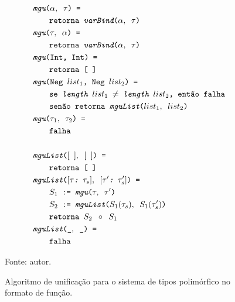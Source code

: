 \begin{figure}[ht!]
  \centering
  \begin{align*}
    & \texttt{\Mgu($\alpha,\Whitespace\tau$) = } \\
    & \qquad{} \texttt{\Return\Whitespace\UnifyVar($\alpha,\Whitespace\tau$)} \\
    & \texttt{\Mgu($\tau,\Whitespace\alpha$) = } \\
    & \qquad{} \texttt{\Return\Whitespace\UnifyVar($\alpha,\Whitespace\tau$)} \\
    & \texttt{\Mgu(\texttt{Int},\Whitespace\texttt{Int}) = } \\
    & \qquad{} \texttt{\Return\Whitespace[$\Whitespace$]} \\
    & \texttt{\Mgu(\texttt{Neg}\Whitespace ${list}_{1}$,\Whitespace\texttt{Neg} ${list}_{2}$) = } \\
    & \qquad{} \texttt{\If \Whitespace \Length\Whitespace${list}_{1}$ $\neq$ \Length\Whitespace${list}_{2}$, \Then \Whitespace \Fail} \\
    & \qquad{} \texttt{\Else\Whitespace\Return\Whitespace\MguList(${list}_{1},\Whitespace{list}_{2}$)} \\
    & \texttt{\Mgu($\tau_1,\Whitespace\tau_2$) = } \\
    & \qquad{} \texttt{\Fail} \\
    \\
    & \texttt{\MguList($[\Whitespace],\Whitespace[\Whitespace]$) = } \\
    & \qquad{} \texttt{\Return\Whitespace[$\Whitespace$]} \\
    & \texttt{\MguList($[\tau\HeadSep\Whitespace\tau_s],\Whitespace[\tau'\HeadSep\Whitespace\tau_s']$) = } \\
    & \qquad{} \texttt{$S_1$\Whitespace:=\Whitespace\Mgu($\tau,\Whitespace\tau'$)} \\
    & \qquad{} \texttt{$S_2$\Whitespace:=\Whitespace\MguList($S_1(\tau_s),\Whitespace S_1(\tau_s')$)} \\
    & \qquad{} \texttt{\Return\Whitespace$S_2\Whitespace \circ\Whitespace S_1$} \\
    & \texttt{\MguList($\_,\Whitespace\_$) = } \\
    & \qquad{} \texttt{\Fail}
  \end{align*}
  \caption{Algoritmo de unificação para o sistema de tipos polimórfico no formato de função.}
  \small{Fonte: autor.}
  \label{algo:mgu-cps}
\end{figure}


